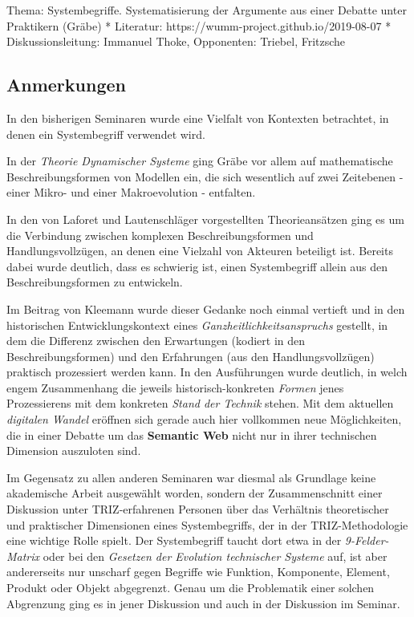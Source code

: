\documentclass[11pt,a4paper]{article}
\begin{document}
Thema: Systembegriffe. Systematisierung der Argumente aus einer Debatte
unter Praktikern (Gräbe) * Literatur:
https://wumm-project.github.io/2019-08-07 * Diskussionsleitung: Immanuel
Thoke, Opponenten: Triebel, Fritzsche

\hypertarget{anmerkungen}{%
\subsection{Anmerkungen}\label{anmerkungen}}

In den bisherigen Seminaren wurde eine Vielfalt von Kontexten
betrachtet, in denen ein Systembegriff verwendet wird.

In der \emph{Theorie Dynamischer Systeme} ging Gräbe vor allem auf
mathematische Beschreibungsformen von Modellen ein, die sich wesentlich
auf zwei Zeitebenen - einer Mikro- und einer Makroevolution - entfalten.

In den von Laforet und Lautenschläger vorgestellten Theorieansätzen ging
es um die Verbindung zwischen komplexen Beschreibungsformen und
Handlungsvollzügen, an denen eine Vielzahl von Akteuren beteiligt ist.
Bereits dabei wurde deutlich, dass es schwierig ist, einen Systembegriff
allein aus den Beschreibungsformen zu entwickeln.

Im Beitrag von Kleemann wurde dieser Gedanke noch einmal vertieft und in
den historischen Entwicklungskontext eines
\emph{Ganzheitlichkeitsanspruchs} gestellt, in dem die Differenz
zwischen den Erwartungen (kodiert in den Beschreibungsformen) und den
Erfahrungen (aus den Handlungsvollzügen) praktisch prozessiert werden
kann. In den Ausführungen wurde deutlich, in welch engem Zusammenhang
die jeweils historisch-konkreten \emph{Formen} jenes Prozessierens mit
dem konkreten \emph{Stand der Technik} stehen. Mit dem aktuellen
\emph{digitalen Wandel} eröffnen sich gerade auch hier vollkommen neue
Möglichkeiten, die in einer Debatte um das \textbf{Semantic Web} nicht
nur in ihrer technischen Dimension auszuloten sind.

Im Gegensatz zu allen anderen Seminaren war diesmal als Grundlage keine
akademische Arbeit ausgewählt worden, sondern der Zusammenschnitt einer
Diskussion unter TRIZ-erfahrenen Personen über das Verhältnis
theoretischer und praktischer Dimensionen eines Systembegriffs, der in
der TRIZ-Methodologie eine wichtige Rolle spielt. Der Systembegriff
taucht dort etwa in der \emph{9-Felder-Matrix} oder bei den
\emph{Gesetzen der Evolution technischer Systeme} auf, ist aber
andererseits nur unscharf gegen Begriffe wie Funktion, Komponente,
Element, Produkt oder Objekt abgegrenzt. Genau um die Problematik einer
solchen Abgrenzung ging es in jener Diskussion und auch in der
Diskussion im Seminar.
\end{document}
